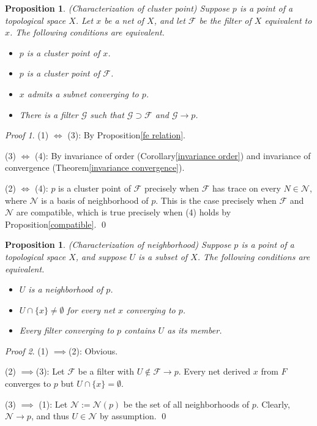 \documentclass[a4paper,12pt]{article}
\newtheorem{prp}[thm]{Proposition}
\theoremstyle{remark}
\newtheorem*{prf}{Proof}
\theoremstyle{definition}
\theoremstyle{definition}
\theoremstyle{definition}
\begin{document}
\begin{prp}\label{characterize cluster point} (Characterization of cluster point)
	Suppose \( p \) is a point of a topological space \( X \). Let \( x \) be a net of \( X \), and let \( \mathscr{F} \) be the filter of \( X \) equivalent to \( x \). The following conditions are equivalent.
	\begin{itemize}
		\item[(1)] \( p \) is a cluster point of \( x \).
		\item[(2)] \( p \) is a cluster point of \( \mathscr{F} \).
		\item[(3)] \( x \) admits a subnet converging to \( p \).
		\item[(4)] There is a filter \( \mathscr{G} \) such that \( \mathscr{G} \supset \mathscr{F} \) and \( \mathscr{G} \to p \).
	\end{itemize}
\end{prp}
\begin{prf}
	(1) \( \iff \) (3): By Proposition\ref{fe relation}.

	(3) \( \iff \) (4): By invariance of order (Corollary\ref{invariance order})  and invariance of convergence (Theorem\ref{invariance convergence}).

	(2) \( \iff \) (4): \( p \) is a cluster point of \( \mathscr{F} \) precisely when \( \mathscr{F} \) has trace on every \( N \in \mathscr{N} \), where \( \mathscr{N} \) is a basis of neighborhood of \( p \). This is the case precisely when \( \mathscr{F} \) and \( \mathscr{N} \) are compatible, which is true precisely when (4) holds by Proposition\ref{compatible}.
	\qed\end{prf}

\begin{prp} (Characterization of neighborhood)
	Suppose \( p \) is a point of a topological space \( X \), and suppose \( U \) is a subset of \( X \). The following conditions are equivalent.
	\begin{itemize}
		\item[(1)] \( U \) is a neighborhood of \( p \).
		\item[(2)] \( U \cap \{x\} \neq \emptyset \) for every net \( x \) converging to \( p \).
		\item[(3)] Every filter converging to \( p \) contains \( U \) as its member.
	\end{itemize}
\end{prp}
\begin{prf}
	(1) \( \implies \)(2): Obvious.

	(2) \( \implies \)(3):
	Let \( \mathscr{F} \) be a filter with \( U \notin \mathscr{F} \to p \). Every net derived \( x \) from \( F \) converges to \( p \) but \( U \cap \{x\} = \emptyset \).

	(3) \( \implies \) (1): Let \( \mathscr{N}:=\mathscr{N}(p) \) be the set of all neighborhoods of \( p \). Clearly, \( \mathscr{N}\to p \), and thus \( U \in \mathscr{N} \) by assumption.
	\qed\end{prf}
\end{document}
